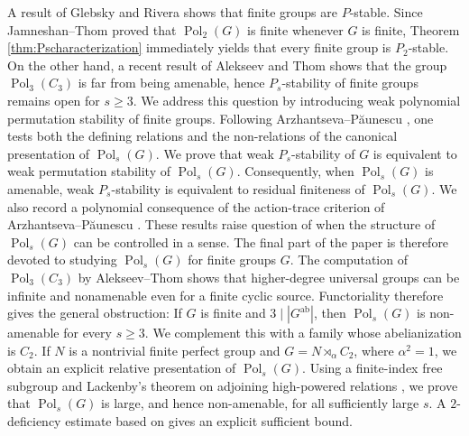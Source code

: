 \documentclass[a4paper,12pt]{amsart}
\theoremstyle{plain}
\theoremstyle{definition}
\theoremstyle{remark}
\numberwithin{equation}{subsection}
\DeclareMathOperator{\Pold}{Pol}
\begin{document}
A result of Glebsky and Rivera \cite{GR09} shows that finite groups are $P$-stable. Since Jamneshan--Thom \cite{JT24} proved that
$\Pold_2(G)$ is finite whenever $G$ is finite, Theorem \ref{thm:Pscharacterization} immediately yields that every finite group is
$P_2$-stable. On the other hand, a recent result of Alekseev and Thom \cite{AT26} shows that the group $\Pold_3(C_3)$ is far from being amenable, hence $P_s$-stability of finite groups remains open for $s\ge 3$. We address this question by introducing weak polynomial permutation stability of finite groups.  Following
Arzhantseva--P\u{a}unescu \cite{AP15}, one tests both the defining
relations and the non-relations of the canonical presentation of
$\Pold_s(G)$.  We prove that weak $P_s$-stability of $G$ is equivalent to
weak permutation stability of $\Pold_s(G)$.  Consequently, when
$\Pold_s(G)$ is amenable, weak $P_s$-stability is equivalent to residual
finiteness of $\Pold_s(G)$.  We also record a polynomial consequence of
the action-trace criterion of Arzhantseva--P\u{a}unescu \cite{AP24}. These results raise question of when the structure of $\Pold_s(G)$ can be controlled in a sense. The final part of the paper is therefore devoted to studying $\Pold_s(G)$ for finite groups $G$. The computation of
$\Pold_3(C_3)$ by Alekseev--Thom \cite{AT26} shows that higher-degree
universal groups can be infinite and nonamenable even for a finite cyclic
source.  Functoriality therefore gives the general obstruction: If $G$ is finite and 
$3\mid |G^{\mathrm{ab}}|$, then 
$\Pold_s(G)$ is non-amenable for every $s\geq3$.
We complement this with a family whose abelianization is $C_2$.  If
$N$ is a nontrivial finite perfect group and
$G=N\rtimes_\alpha C_2$, where $\alpha^2=1$, we obtain an explicit
relative presentation of $\Pold_s(G)$.  Using a finite-index free subgroup
and Lackenby's theorem on adjoining high-powered relations
\cite{Lac07}, we prove that $\Pold_s(G)$ is large, and hence
non-amenable, for all sufficiently large $s$.  A $2$-deficiency estimate
based on \cite{BT11} gives an explicit sufficient bound.
\end{document}
